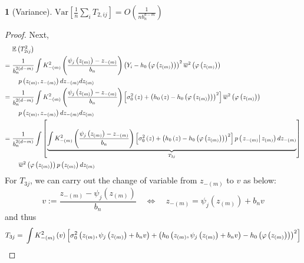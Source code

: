 \documentclass[12pt,american]{article}
\theoremstyle{definition}
\theoremstyle{plain}
\theoremstyle{definition}
\theoremstyle{plain}
\newtheorem{lem}{\protect\lemmaname}
\theoremstyle{plain}
\theoremstyle{plain}
\theoremstyle{plain}
\theoremstyle{plain}
\newcommand{\E}{\mathbb{E}}
\providecommand{\lemmaname}{Lemma}
\providecommand{\lemmaname}{Lemma}
\begin{document}
\begin{lem}[Variance]\label{k-var}
$\text{Var}\left[\frac{1}{n}\sum_{i}T_{2,ij}\right] =O\left(\frac{1}{nb_{n}^{d-m}}\right)$
\end{lem}
\begin{proof}
Next,
\begin{align*}
& \E\left(T_{2ij}^{2}\right) \\
=\ & \frac{1}{b_{n}^{2\left(d-m\right)}}\int K_{-\left(m\right)}^{2}\left(\frac{\psi_{j}\left(z_{\left(m\right)}\right)-z_{-\left(m\right)}}{b_{n}}\right)\left(Y_{i}-h_{0}\left(\varphi\left(z_{\left(m\right)}\right)\right)\right)^{2}\ol w^{2}\left(\varphi\left(z_{\left(m\right)}\right)\right)\\
&\quad p\left(z_{\left(m\right)},z_{-\left(m\right)}\right)dz_{-\left(m\right)}dz_{\left(m\right)}\\
 =\ & \frac{1}{b_{n}^{2\left(d-m\right)}}\int K_{-\left(m\right)}^{2}\left(\frac{\psi_{j}\left(z_{\left(m\right)}\right)-z_{-\left(m\right)}}{b_{n}}\right)\left[\s_{0}^{2}\left(z\right)+\left(h_{0}\left(z\right)-h_{0}\left(\varphi\left(z_{\left(m\right)}\right)\right)\right)^{2}\right]\ol w^{2}\left(\varphi\left(z_{\left(m\right)}\right)\right)\\
 &\quad p\left(z_{\left(m\right)},z_{-\left(m\right)}\right)dz_{-\left(m\right)}dz_{\left(m\right)}\\
 =\ & \frac{1}{b_{n}^{2\left(d-m\right)}}\int\left[\underset{T_{3j}}{\underbrace{\int K_{-\left(m\right)}^{2}\left(\frac{\psi_{j}\left(z_{\left(m\right)}\right)-z_{-\left(m\right)}}{b_{n}}\right)\left[\s_{0}^{2}\left(z\right)+\left(h_{0}\left(z\right)-h_{0}\left(\varphi\left(z_{\left(m\right)}\right)\right)\right)^{2}\right] p\left(\rest{z_{-\left(m\right)}}z_{\left(m\right)}\right)dz_{-\left(m\right)}}}\right]\\
 &\quad \ol w^{2}\left(\varphi\left(z_{\left(m\right)}\right)\right)p\left(z_{\left(m\right)}\right)dz_{\left(m\right)}
\end{align*}
For $T_{3j}$, we can carry out the change of variable from $z_{-\left(m\right)}$
to $v$ as below:
\[
v:=\frac{z_{-\left(m\right)}-\psi_{j}\left(z_{\left(m\right)}\right)}{b_{n}}\quad\iff\quad z_{-\left(m\right)}=\psi_{j}\left(z_{\left(m\right)}\right)+b_{n}v
\]
and thus
\begin{align*}
T_{3j} =\ & \int K_{-\left(m\right)}^{2}\left(v\right)\left[\s_{0}^{2}\left(z_{\left(m\right)},\psi_{j}\left(z_{\left(m\right)}\right)+b_{n}v\right)+\left(h_{0}\left(z_{\left(m\right)},\psi_{j}\left(z_{\left(m\right)}\right)+b_{n}v\right)-h_{0}\left(\varphi\left(z_{\left(m\right)}\right)\right)\right)^{2}\right]\\

\end{align*}
\end{proof}
\end{document}
